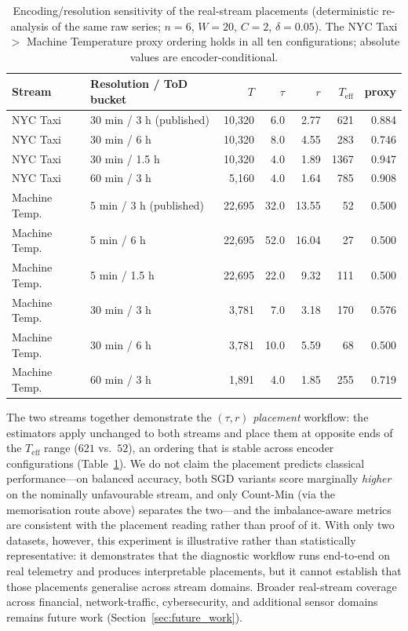 \documentclass[sensors,article,submit,pdftex,moreauthors]{Definitions/mdpi}
\newcommand{\Teff}{T_{\mathrm{eff}}}
\providecommand{\DIFadd}[1]{{\protect\color{blue}#1}} %
\providecommand{\DIFdel}[1]{} %
\providecommand{\DIFaddbegin}{} %
\providecommand{\DIFaddend}{} %
\providecommand{\DIFdelbegin}{} %
\providecommand{\DIFdelend}{} %
\providecommand{\DIFaddFL}[1]{\DIFadd{#1}} %
\begin{document}
\begin{table}[t]
\centering
\caption{\DIFaddFL{Encoding/resolution sensitivity of the real-stream placements (deterministic re-analysis of the same raw series; $n = 6$, $W = 20$, $C = 2$, $\delta = 0.05$). The NYC Taxi $>$ Machine Temperature proxy ordering holds in all ten configurations; absolute values are encoder-conditional.}}
\label{tab:encoder_sens}
\small
\begin{tabular}{@{}llrrrrr@{}}
\toprule
Stream & Resolution / ToD bucket & $T$ & $\tau$ & $r$ & $\Teff$ & proxy \\
\midrule
NYC Taxi & 30 min / 3 h (published) & 10{,}320 & 6.0 & 2.77 & 621 & 0.884 \\
NYC Taxi & 30 min / 6 h & 10{,}320 & 8.0 & 4.55 & 283 & 0.746 \\
NYC Taxi & 30 min / 1.5 h & 10{,}320 & 4.0 & 1.89 & 1367 & 0.947 \\
NYC Taxi & 60 min / 3 h & 5{,}160 & 4.0 & 1.64 & 785 & 0.908 \\
\midrule
Machine Temp. & 5 min / 3 h (published) & 22{,}695 & 32.0 & 13.55 & 52 & 0.500 \\
Machine Temp. & 5 min / 6 h & 22{,}695 & 52.0 & 16.04 & 27 & 0.500 \\
Machine Temp. & 5 min / 1.5 h & 22{,}695 & 22.0 & 9.32 & 111 & 0.500 \\
Machine Temp. & 30 min / 3 h & 3{,}781 & 7.0 & 3.18 & 170 & 0.576 \\
Machine Temp. & 30 min / 6 h & 3{,}781 & 10.0 & 5.59 & 68 & 0.500 \\
Machine Temp. & 60 min / 3 h & 1{,}891 & 4.0 & 1.85 & 255 & 0.719 \\
\bottomrule
\end{tabular}
\end{table}

\DIFadd{The two streams together demonstrate the $(\tau, r)$ }\emph{\DIFadd{placement}} \DIFadd{workflow: the estimators apply unchanged to both streams and place them at opposite ends of the $\Teff$ range ($621$ vs.\ $52$), an ordering that is stable across encoder configurations (Table~\ref{tab:encoder_sens}). We do not claim the placement predicts classical performance---on balanced accuracy, both SGD variants score marginally }\emph{\DIFadd{higher}} \DIFadd{on the nominally unfavourable stream, and only Count-Min (via the memorisation route above) separates the two---and }\DIFaddend the \DIFdelbegin \DIFdel{synthetic regimes, and the }\DIFdelend imbalance-aware metrics \DIFdelbegin \DIFdel{confirm }\DIFdelend \DIFaddbegin \DIFadd{are consistent with the placement reading rather than proof of it. With only two datasets, however, this experiment is illustrative rather than statistically representative: it demonstrates }\DIFaddend that the diagnostic \DIFdelbegin \DIFdel{is not an artefact of accuracy on imbalanced labels}\DIFdelend \DIFaddbegin \DIFadd{workflow runs end-to-end on real telemetry and produces interpretable placements, but it cannot establish that those placements generalise across stream domains}\DIFaddend . Broader real-stream coverage across financial, network-traffic, \DIFaddbegin \DIFadd{cybersecurity, }\DIFaddend and additional sensor domains remains future work (Section~\ref{sec:future_work}).
\end{document}
